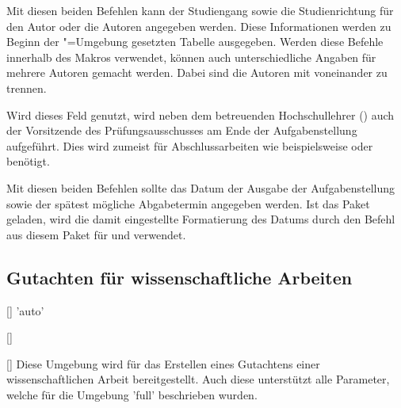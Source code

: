 \begin{Declaration*}{}
\begin{Declaration}{}
\begin{Declaration}{}
\printdeclarationlist%
%
%
Mit diesen beiden Befehlen kann der Studiengang sowie die Studienrichtung für 
den Autor oder die Autoren angegeben werden. Diese Informationen werden zu 
Beginn der "=Umgebung gesetzten Tabelle ausgegeben. Werden 
diese Befehle innerhalb des Makros  verwendet, können auch 
unterschiedliche Angaben für mehrere Autoren gemacht werden. Dabei sind die 
Autoren mit  voneinander zu trennen.
\end{Declaration}
\end{Declaration}

\begin{Declaration}{}
\printdeclarationlist%
%
Wird dieses Feld genutzt, wird neben dem betreuenden Hochschullehrer 
() auch der Vorsitzende des Prüfungsausschusses am Ende der 
Aufgabenstellung aufgeführt. Dies wird zumeist für Abschlussarbeiten wie 
beispielsweise \masterthesisname{} oder \diplomathesisname{} benötigt.
\end{Declaration}

\begin{Declaration}{}
\begin{Declaration}{}
\printdeclarationlist%
%
Mit diesen beiden Befehlen sollte das Datum der Ausgabe der Aufgabenstellung 
sowie der spätest mögliche Abgabetermin angegeben werden. Ist das Paket 
 geladen, wird die damit eingestellte Formatierung des Datums 
durch den Befehl  aus diesem Paket für  und 
 verwendet.
\end{Declaration}
\end{Declaration}


\subsection{Gutachten für wissenschaftliche Arbeiten}
\begin{Declaration}{[]}{%
  'auto'%
}
\begin{Declaration}{%
  []%
}
\begin{Declaration}{[]}
\printdeclarationlist%
%
%
Diese Umgebung wird für das Erstellen eines Gutachtens einer wissenschaftlichen 
Arbeit bereitgestellt. Auch diese unterstützt alle Parameter, welche für die 
Umgebung 'full' beschrieben wurden.


\end{Declaration}
\end{Declaration}
\end{Declaration}
\end{Declaration*}

